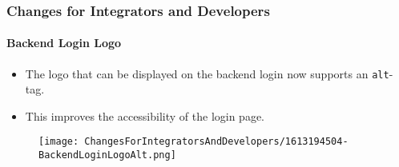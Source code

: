 %

\begin{frame}[fragile]
	\frametitle{Changes for Integrators and Developers}
	\framesubtitle{Backend Login Logo}


	\begin{itemize}
		\item The logo that can be displayed on the backend login now supports
			an \texttt{alt}-tag.
		\item This improves the accessibility of the login page.
	\end{itemize}

	\begin{figure}
		\texttt{[image: ChangesForIntegratorsAndDevelopers/1613194504-BackendLoginLogoAlt.png]}
	\end{figure}

\end{frame}

